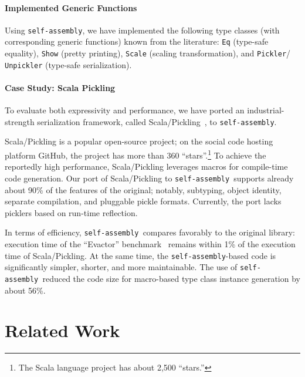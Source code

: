 \documentclass[preprint,nocopyrightspace]{sigplanconf}
\newcommand{\selfassembly}{\texttt{self-assembly~}}
\newcommand{\sselfassembly}{\texttt{self-assembly}}
\begin{document}
\paragraph{Implemented Generic Functions}

Using \sselfassembly, we have implemented the following type classes (with
corresponding generic functions) known from the literature: \verb|Eq|
(type-safe equality), \verb|Show| (pretty printing), \verb|Scale| (scaling
transformation), and \verb|Pickler|/\\\verb|Unpickler| (type-safe serialization).

\paragraph{Case Study: Scala Pickling}

To evaluate both expressivity and performance, we have ported an
industrial-strength serialization framework, called Scala/Pickling~\cite{Pickling}, to \sselfassembly.

Scala/Pickling is a popular open-source project; on the social code
hosting platform GitHub, the project has more than 360 ``stars''.\footnote{The
Scala language project has about 2,500 ``stars.''} To achieve the reportedly
high performance, Scala/Pickling leverages macros for compile-time code
generation. Our port of Scala/Pickling to \selfassembly supports
already about 90\% of the features of the original; notably, subtyping, object
identity, separate compilation, and pluggable pickle formats. Currently, the
port lacks picklers based on run-time reflection.

In terms of efficiency,  \selfassembly compares favorably to the original
library: execution time of the ``Evactor'' benchmark~\cite{Pickling} remains
within 1\% of the execution time of Scala/Pickling. At the same time,
the \sselfassembly-based code is significantly simpler, shorter, and more
maintainable. The use of \selfassembly reduced the code size for macro-based
type class instance generation by about 56\%.



\section{Related Work}
\label{sec:related-work}
\end{document}
